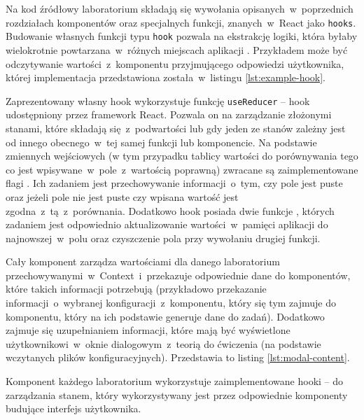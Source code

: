Na kod źródłowy laboratorium składają się wywołania opisanych~w~poprzednich rozdziałach komponentów
oraz specjalnych funkcji, znanych~w~React jako \texttt{hooks}. Budowanie własnych funkcji typu
\texttt{hook} pozwala na ekstrakcję logiki, która byłaby wielokrotnie powtarzana~w~różnych miejscach
aplikacji \cite{react-docs}. Przykładem może być odczytywanie wartości~z~komponentu przyjmującego
odpowiedzi użytkownika, której implementacja przedstawiona została~w~listingu
\ref{lst:example-hook}.


Zaprezentowany własny hook wykorzystuje funkcję \texttt{useReducer} -- hook udostępniony przez
framework React. Pozwala on na zarządzanie złożonymi stanami, które składają się~z~podwartości lub
gdy jeden ze stanów zależny jest od innego obecnego~w~tej samej funkcji lub komponencie. Na
podstawie zmiennych wejściowych (w tym przypadku tablicy wartości do porównywania tego co jest
wpisywane~w~pole~z~wartością poprawną) zwracane są zaimplementowane flagi . Ich zadaniem jest przechowywanie informacji~o~tym, czy pole jest puste oraz jeżeli
pole nie jest puste czy wpisana wartość jest zgodna~z~tą~z~porównania. Dodatkowo hook posiada dwie
funkcje , których zadaniem jest odpowiednio aktualizowanie
wartości~w~pamięci aplikacji do najnowszej~w~polu oraz czyszczenie pola przy wywołaniu drugiej
funkcji.

Cały komponent zarządza wartościami dla danego laboratorium przechowywanymi~w~Context~i~przekazuje
odpowiednie dane do komponentów, które takich informacji potrzebują (przykładowo przekazanie
informacji~o~wybranej konfiguracji~z~komponentu, który się tym zajmuje do komponentu, który na ich
podstawie generuje dane do zadań). Dodatkowo zajmuje się uzupełnianiem informacji, które mają być
wyświetlone użytkownikowi~w~oknie dialogowym~z~teorią do ćwiczenia (na podstawie wczytanych plików
konfiguracyjnych). Przedstawia to listing \ref{lst:modal-content}.


Komponent każdego laboratorium wykorzystuje zaimplementowane hooki --  do zarządzania stanem, który
wykorzystywany jest przez odpowiednie komponenty budujące interfejs użytkownika.

